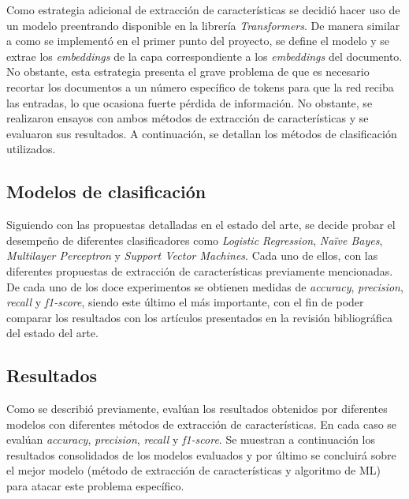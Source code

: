 Como estrategia adicional de extracción de características se decidió hacer uso de un modelo preentrando disponible en la librería \textit{Transformers}. De manera similar a como se implementó en el primer punto del proyecto, se define el modelo y se extrae los \textit{embeddings} de la capa correspondiente a los \textit{embeddings} del documento. No obstante, esta estrategia presenta el grave problema de que es necesario recortar los documentos a un número específico de tokens para que la red reciba las entradas, lo que ocasiona fuerte pérdida de información. No obstante, se realizaron ensayos con ambos métodos de extracción de características y se evaluaron sus resultados. A continuación, se detallan los métodos de clasificación utilizados.

\subsection{Modelos de clasificación}
Siguiendo con las propuestas detalladas en el estado del arte, se decide probar el desempeño de diferentes clasificadores como \textit{Logistic Regression}, \textit{Naïve Bayes}, \textit{Multilayer Perceptron} y \textit{Support Vector Machines}. Cada uno de ellos, con las diferentes propuestas de extracción de características previamente mencionadas. De cada uno de los doce experimentos se obtienen medidas de \textit{accuracy}, \textit{precision}, \textit{recall} y \textit{f1-score}, siendo este último el más importante, con el fin de poder comparar los resultados con los artículos presentados en la revisión bibliográfica del estado del arte.

\subsection{Resultados}
Como se describió previamente, evalúan los resultados obtenidos por diferentes modelos con diferentes métodos de extracción de características. En cada caso se evalúan \textit{accuracy}, \textit{precision}, \textit{recall} y \textit{f1-score}. Se muestran a continuación los resultados consolidados de los modelos evaluados y por último se concluirá sobre el mejor modelo (método de extracción de características y algoritmo de ML) para atacar este problema específico.



